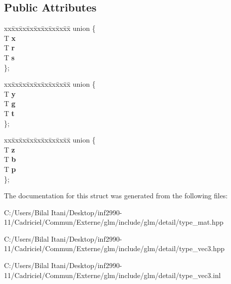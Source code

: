 \subsection*{Public Attributes}
\begin{DoxyCompactItemize}
\item 
\begin{tabbing}
xx\=xx\=xx\=xx\=xx\=xx\=xx\=xx\=xx\=\kill
union \{\\
\>T {\bfseries x}\\
\>T {\bfseries r}\\
\>T {\bfseries s}\\
\}; \hypertarget{structglm_1_1detail_1_1tvec3_a95db915d0bfa833abb7d58b568499f6f}{}\label{structglm_1_1detail_1_1tvec3_a95db915d0bfa833abb7d58b568499f6f}
\\

\end{tabbing}\item 
\begin{tabbing}
xx\=xx\=xx\=xx\=xx\=xx\=xx\=xx\=xx\=\kill
union \{\\
\>T {\bfseries y}\\
\>T {\bfseries g}\\
\>T {\bfseries t}\\
\}; \hypertarget{structglm_1_1detail_1_1tvec3_a7bab71ab14f740a398b2ea319b38be42}{}\label{structglm_1_1detail_1_1tvec3_a7bab71ab14f740a398b2ea319b38be42}
\\

\end{tabbing}\item 
\begin{tabbing}
xx\=xx\=xx\=xx\=xx\=xx\=xx\=xx\=xx\=\kill
union \{\\
\>T {\bfseries z}\\
\>T {\bfseries b}\\
\>T {\bfseries p}\\
\}; \hypertarget{structglm_1_1detail_1_1tvec3_a8155637e491e13ea65ca42b96ccc7360}{}\label{structglm_1_1detail_1_1tvec3_a8155637e491e13ea65ca42b96ccc7360}
\\

\end{tabbing}\end{DoxyCompactItemize}


The documentation for this struct was generated from the following files\+:\begin{DoxyCompactItemize}
\item 
C\+:/\+Users/\+Bilal Itani/\+Desktop/inf2990-\/11/\+Cadriciel/\+Commun/\+Externe/glm/include/glm/detail/type\+\_\+mat.\+hpp\item 
C\+:/\+Users/\+Bilal Itani/\+Desktop/inf2990-\/11/\+Cadriciel/\+Commun/\+Externe/glm/include/glm/detail/type\+\_\+vec3.\+hpp\item 
C\+:/\+Users/\+Bilal Itani/\+Desktop/inf2990-\/11/\+Cadriciel/\+Commun/\+Externe/glm/include/glm/detail/type\+\_\+vec3.\+inl\end{DoxyCompactItemize}
